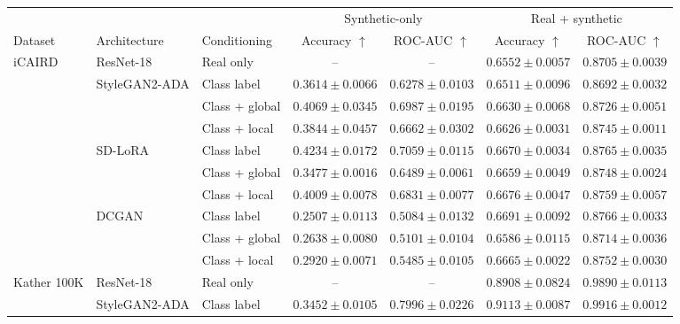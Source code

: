 \begin{table}[htbp]
\centering
\scriptsize
\setlength{\tabcolsep}{3.5pt}
\renewcommand{\arraystretch}{1.08}
\begin{tabular}{lllcccc}
\toprule
& & & \multicolumn{2}{c}{Synthetic-only} & \multicolumn{2}{c}{Real + synthetic} \\
\cmidrule(lr){4-5}\cmidrule(lr){6-7}
Dataset & Architecture & Conditioning
& Accuracy $\uparrow$ & ROC-AUC $\uparrow$
& Accuracy $\uparrow$ & ROC-AUC $\uparrow$ \\
\midrule
\multirow{10}{*}{iCAIRD}
 & ResNet-18 & Real only & -- & -- & $0.6552 \pm 0.0057$ & $0.8705 \pm 0.0039$ \\
\cmidrule(lr){2-7}
 & \multirow{3}{*}{StyleGAN2-ADA}
 & Class label    & $0.3614 \pm 0.0066$ & $0.6278 \pm 0.0103$ & $0.6511 \pm 0.0096$ & $0.8692 \pm 0.0032$ \\
 & & Class + global & $\mathbf{0.4069 \pm 0.0345}$ & $\mathbf{0.6987 \pm 0.0195}$ & $\mathbf{0.6630 \pm 0.0068}$ & $0.8726 \pm 0.0051$ \\
 & & Class + local  & $0.3844 \pm 0.0457$ & $0.6662 \pm 0.0302$ & $0.6626 \pm 0.0031$ & $\mathbf{0.8745 \pm 0.0011}$ \\
\cmidrule(lr){2-7}
 & \multirow{3}{*}{SD-LoRA}
 & Class label    & $\mathbf{0.4234 \pm 0.0172}$ & $\mathbf{0.7059 \pm 0.0115}$ & $0.6670 \pm 0.0034$ & $\mathbf{0.8765 \pm 0.0035}$ \\
 & & Class + global & $0.3477 \pm 0.0016$ & $0.6489 \pm 0.0061$ & $0.6659 \pm 0.0049$ & $0.8748 \pm 0.0024$ \\
 & & Class + local  & $0.4009 \pm 0.0078$ & $0.6831 \pm 0.0077$ & $\mathbf{0.6676 \pm 0.0047}$ & $0.8759 \pm 0.0057$ \\
\cmidrule(lr){2-7}
 & \multirow{3}{*}{DCGAN}
 & Class label    & $0.2507 \pm 0.0113$ & $0.5084 \pm 0.0132$ & $\mathbf{0.6691 \pm 0.0092}$ & $\mathbf{0.8766 \pm 0.0033}$ \\
 & & Class + global & $0.2638 \pm 0.0080$ & $0.5101 \pm 0.0104$ & $0.6586 \pm 0.0115$ & $0.8714 \pm 0.0036$ \\
 & & Class + local  & $\mathbf{0.2920 \pm 0.0071}$ & $\mathbf{0.5485 \pm 0.0105}$ & $0.6665 \pm 0.0022$ & $0.8752 \pm 0.0030$ \\
\midrule
\multirow{10}{*}{Kather 100K}
 & ResNet-18 & Real only & -- & -- & $0.8908 \pm 0.0824$ & $0.9890 \pm 0.0113$ \\
\cmidrule(lr){2-7}
 & \multirow{3}{*}{StyleGAN2-ADA}
 & Class label    & $0.3452 \pm 0.0105$ & $0.7996 \pm 0.0226$ & $0.9113 \pm 0.0087$ & $0.9916 \pm 0.0012$ \\

\end{tabular}
\end{table}
